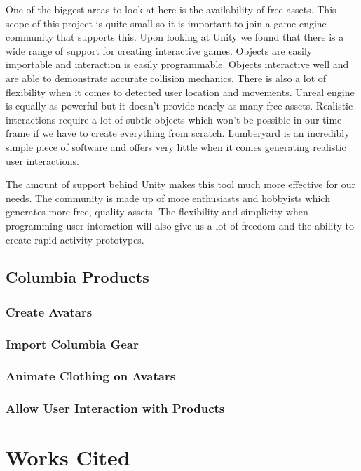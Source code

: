 \documentclass[10pt,journal,compsoc,onecolumn, draftclsnofoot]{IEEEtran}
\begin{document}
One of the biggest areas to look at here is the availability of free assets. This scope of this project is quite small so it is important to join a game engine community that supports this. Upon looking at Unity we found that there is a wide range of support for creating interactive games. Objects are easily importable and interaction is easily programmable. Objects interactive well and are able to demonstrate accurate collision mechanics. There is also a lot of flexibility when it comes to detected user location and movements. Unreal engine is equally as powerful but it doesn’t provide nearly as many free assets. Realistic interactions require a lot of subtle objects which won’t be possible in our time frame if we have to create everything from scratch. Lumberyard is an incredibly simple piece of software and offers very little when it comes generating realistic user interactions.

The amount of support behind Unity makes this tool much more effective for our needs. The community is made up of more enthusiasts and hobbyists which generates more free, quality assets. The flexibility and simplicity when programming user interaction will also give us a lot of freedom and the ability to create rapid activity prototypes.
\vspace{2mm}


\subsection{Columbia Products}
\subsubsection{Create Avatars}

\subsubsection{Import Columbia Gear}

\subsubsection{Animate Clothing on Avatars}

\subsubsection{Allow User Interaction with Products}


\section{Works Cited}


\end{document}
